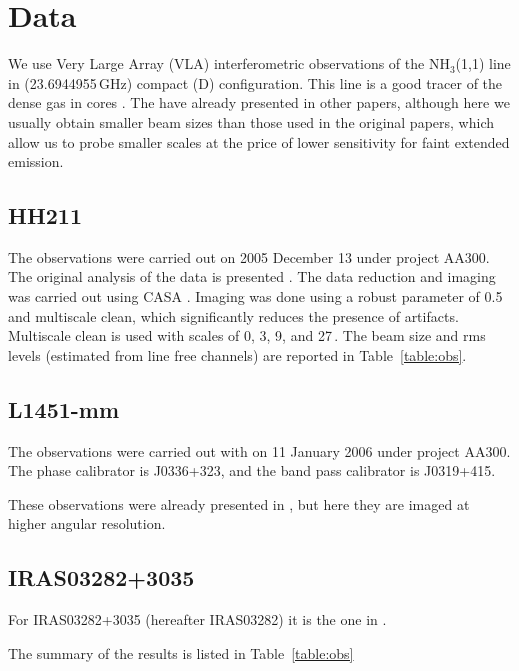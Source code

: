 \section{Data}

We use Very Large Array (VLA) interferometric observations of the NH$_3$(1,1) line in (23.6944955\,GHz)
compact (D) configuration. 
This line is a good tracer of the dense gas in cores \cite{Benson_1989,Goodman_1998,Tafalla_2004,Pineda_2010}.
The have already presented in other papers, although here we usually obtain smaller beam sizes than those 
used in the original papers, which allow us to probe smaller scales at the 
price of lower sensitivity for faint extended emission.

\subsection{HH211}
The observations were carried out on 2005 December 13 under project AA300. 
The original analysis of the data is presented \cite{Tanner_2010}.
The data reduction and imaging was carried out using CASA \cite{2007ASPC..376..127M}. 
Imaging was done using a robust parameter of 0.5 and multiscale clean, which significantly reduces 
the presence of artifacts. 
Multiscale clean is used with scales of 0, 3, 9, and 27\,\arcsec. 
The beam size and rms levels (estimated from line free channels) are reported in Table~\ref{table:obs}.

\subsection{L1451-mm}
The observations were carried out with on 11 January 2006 under project AA300. 
The phase calibrator is J0336+323, and the band pass calibrator is J0319+415.

These observations were already presented in \cite{Pineda_2011}, but here they are 
imaged at higher angular resolution.

\subsection{IRAS03282+3035}
For IRAS03282+3035 (hereafter IRAS03282) it is the one in \cite{Tobin_2011}. 

The summary of the results is listed in Table~\ref{table:obs}

